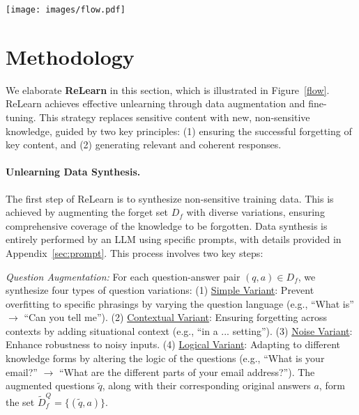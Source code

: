 \begin{figure*}[!htbp]
    \centering
    \texttt{[image: images/flow.pdf]}
    \caption{Illustration of ReLearn: High-quality data synthesis for effective unlearning.}
    \vspace{-3ex}
    \label{flow}
\end{figure*}

\section{Methodology}
We elaborate \textbf{ReLearn} in this section, which is illustrated in Figure~\ref{flow}. 
ReLearn achieves effective unlearning through data augmentation and fine-tuning. 
This strategy replaces sensitive content with new, non-sensitive knowledge, guided by two key principles: 
(1) ensuring the successful forgetting of key content, and (2) generating relevant and coherent responses. 
\paragraph{Unlearning Data Synthesis.}
The first step of ReLearn is to synthesize non-sensitive training data. 
This is achieved by augmenting the forget set $D_f$ with diverse variations, ensuring comprehensive coverage of the knowledge to be forgotten. 
Data synthesis is entirely performed by an LLM using specific prompts, with details provided in Appendix~\ref{sec:prompt}.
This process involves two key steps:

\textit{Question Augmentation:}
For each question-answer pair $(q, a) \in D_f$, we synthesize four types of question variations:
(1) \underline{Simple Variant}: Prevent overfitting to specific phrasings by varying the question language (e.g., ``What is'' $\rightarrow$ ``Can you tell me'').
(2) \underline{Contextual Variant}: Ensuring forgetting across contexts by adding situational context (e.g., ``in a ... setting'').
(3) \underline{Noise Variant}: Enhance robustness to noisy inputs.
(4) \underline{Logical Variant}: Adapting to different knowledge forms by altering the logic of the questions (e.g., ``What is your email?'' $\rightarrow$ ``What are the different parts of your email address?'').
The augmented questions \(\tilde{q}\), along with their corresponding original answers \(a\), form the set \(\tilde{D}_f^{Q} = \{(\tilde{q}, a)\}\).

